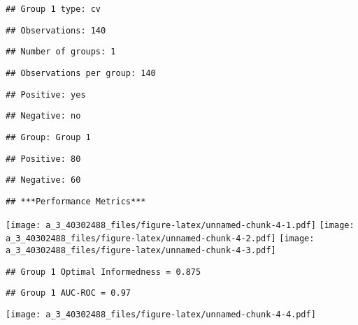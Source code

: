 \documentclass[
]{article}
\newenvironment{Shaded}{\begin{snugshade}}{\end{snugshade}}
\newcommand{\NormalTok}[1]{#1}
\newcommand{\SpecialCharTok}[1]{\textcolor[rgb]{0.00,0.00,0.00}{#1}}
\begin{document}
\begin{verbatim}
## Group 1 type: cv
\end{verbatim}

\begin{verbatim}
## Observations: 140
\end{verbatim}

\begin{verbatim}
## Number of groups: 1
\end{verbatim}

\begin{verbatim}
## Observations per group: 140
\end{verbatim}

\begin{verbatim}
## Positive: yes
\end{verbatim}

\begin{verbatim}
## Negative: no
\end{verbatim}

\begin{verbatim}
## Group: Group 1
\end{verbatim}

\begin{verbatim}
## Positive: 80
\end{verbatim}

\begin{verbatim}
## Negative: 60
\end{verbatim}

\begin{verbatim}
## ***Performance Metrics***
\end{verbatim}

\texttt{[image: a\_3\_40302488\_files/figure-latex/unnamed-chunk-4-1.pdf]}
\texttt{[image: a\_3\_40302488\_files/figure-latex/unnamed-chunk-4-2.pdf]}
\texttt{[image: a\_3\_40302488\_files/figure-latex/unnamed-chunk-4-3.pdf]}

\begin{verbatim}
## Group 1 Optimal Informedness = 0.875
\end{verbatim}

\begin{verbatim}
## Group 1 AUC-ROC = 0.97
\end{verbatim}

\texttt{[image: a\_3\_40302488\_files/figure-latex/unnamed-chunk-4-4.pdf]}

\begin{Shaded}
\end{Shaded}
\end{document}
